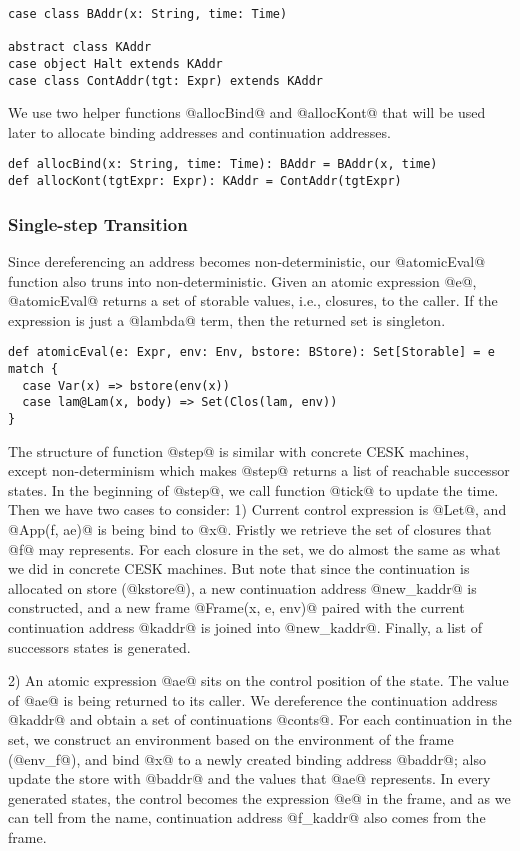 \documentclass[acmsmall,review,anonymous]{acmart}\settopmatter{printfolios=true,printccs=false,printacmref=false}
\begin{document}
\begin{lstlisting}
case class BAddr(x: String, time: Time)

abstract class KAddr
case object Halt extends KAddr
case class ContAddr(tgt: Expr) extends KAddr
\end{lstlisting}

We use two helper functions @allocBind@ and @allocKont@ that will be used later
to allocate binding addresses and continuation addresses.

\begin{lstlisting}
def allocBind(x: String, time: Time): BAddr = BAddr(x, time)
def allocKont(tgtExpr: Expr): KAddr = ContAddr(tgtExpr)
\end{lstlisting}

\subsubsection{Single-step Transition}

Since dereferencing an address becomes non-deterministic, our @atomicEval@
function also truns into non-deterministic. Given an atomic expression @e@,
@atomicEval@ returns a set of storable values, i.e., closures, to the caller.
If the expression is just a @lambda@ term, then the returned set is singleton.

\begin{lstlisting}
def atomicEval(e: Expr, env: Env, bstore: BStore): Set[Storable] = e match {
  case Var(x) => bstore(env(x))
  case lam@Lam(x, body) => Set(Clos(lam, env))
}
\end{lstlisting}

The structure of function @step@ is similar with concrete CESK machines, 
except non-determinism which makes @step@ returns a list of reachable 
successor states.
In the beginning of @step@, we call function @tick@ to update 
the time.
Then we have two cases to consider: 1) Current control expression is @Let@,
and @App(f, ae)@ is being bind to @x@.
Fristly we retrieve the set of closures that @f@ may represents.
For each closure in the set, we do almost the same as what we did in concrete 
CESK machines. But note that since the continuation is allocated on store (@kstore@),
a new continuation address @new_kaddr@ is constructed, and a new frame
@Frame(x, e, env)@ paired with the current continuation address @kaddr@
is joined into @new_kaddr@. Finally, a list of successors states is generated.

2) An atomic expression @ae@ sits on the control position of the state.
The value of @ae@ is being returned to its caller. 
We dereference the continuation address @kaddr@ and obtain a set of
continuations @conts@.
For each continuation in the set, we construct an environment based on the
environment of the frame (@env_f@), and bind @x@ to a newly created binding 
address @baddr@; also update the store with @baddr@ and 
the values that @ae@ represents. In every generated states,
the control becomes the expression @e@ in the frame,
and as we can tell from the name, continuation address @f_kaddr@
also comes from the frame.
\end{document}
